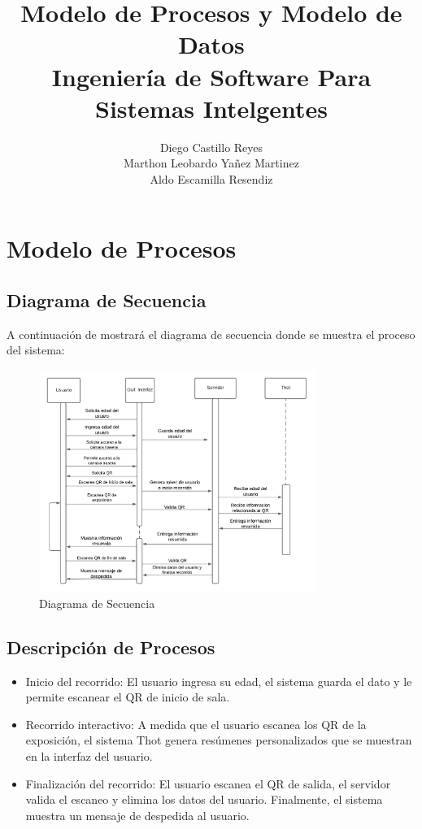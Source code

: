 \documentclass{report}
\title{\Huge{\textbf{Modelo de Procesos y Modelo de Datos}}\\
\Large{\textbf{Ingeniería de Software Para Sistemas Intelgentes}}}
\author{Diego Castillo Reyes\\Marthon Leobardo Yañez Martinez\\Aldo Escamilla Resendiz}
\begin{document}
\maketitle
\section{Modelo de Procesos}
\subsection*{Diagrama de Secuencia}
A continuación de mostrará el diagrama de secuencia donde se
muestra el proceso del sistema:
\begin{figure}[H]
    \centering
    \includegraphics[width=0.8\textwidth]{Diagrama de secuencia.png}
    \caption{Diagrama de Secuencia}
\end{figure}
\subsection*{Descripción de Procesos}
\begin{itemize}
    \item Inicio del recorrido: El usuario ingresa su edad, el sistema guarda el dato y le permite escanear el QR de inicio de sala.
    \item Recorrido interactivo: A medida que el usuario escanea los QR de la exposición, el sistema Thot genera resúmenes personalizados que se muestran en la interfaz del usuario.
    \item Finalización del recorrido: El usuario escanea el QR de salida, el servidor valida el escaneo y elimina los datos del usuario. Finalmente, el sistema muestra un mensaje de despedida al usuario.
\end{itemize}
\end{document}
